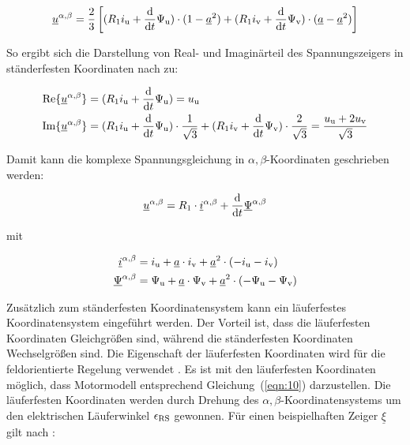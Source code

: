 \begin{align}
\underline{u}^{\alpha, \beta} = \frac{2}{3} \left[ (R_{\mathrm{1}}i_{\mathrm{u}} + \frac{\mathrm{d}}{\mathrm{d}t}\Psi_{\mathrm{u}})\cdot (1-\underline{a}^2) + (R_{\mathrm{1}}i_{\mathrm{v}} + \frac{\mathrm{d}}{\mathrm{d}t}\Psi_{\mathrm{v}})\cdot (\underline{a}-\underline{a}^2) \right]
\end{align}

So ergibt sich die Darstellung von Real- und Imaginärteil des Spannungszeigers in ständerfesten Koordinaten nach \textcite{kellner2012} zu:

\begin{align}
	\text{Re}\{ \underline{u}^{\alpha,\beta} \} &= (R_{\mathrm{1}}i_{\mathrm{u}}+\frac{\mathrm{d}}{\mathrm{d}t}\Psi_{\mathrm{u}}) = u_{\mathrm{u}} \\
	\text{Im}\{ \underline{u}^{\alpha,\beta} \} &= (R_{\mathrm{1}}i_{\mathrm{u}}+\frac{\mathrm{d}}{\mathrm{d}t}\Psi_{\mathrm{u}})\cdot \frac{1}{\sqrt{3}} + (R_{\mathrm{1}}i_{\mathrm{v}}+\frac{\mathrm{d}}{\mathrm{d}t}\Psi_{\mathrm{v}})\cdot \frac{2}{\sqrt{3}} = \frac{u_{\mathrm{u}}+2u_{\mathrm{v}}}{\sqrt{3}}
\end{align}

Damit kann die komplexe Spannungsgleichung in $\alpha,\beta$-Koordinaten geschrieben werden:

\begin{align}
	\underline{u}^{\alpha,\beta} = R_{\mathrm{1}}\cdot\underline{i}^{\alpha,\beta}+\frac{\mathrm{d}}{\mathrm{d}t}\underline{\Psi}^{\alpha,\beta}
\end{align}

mit

\begin{align}
	\underline{i}^{\alpha,\beta} &= i_{\mathrm{u}} + \underline{a}\cdot i_{\mathrm{v}} + \underline{a}^{2}\cdot (-i_{\mathrm{u}}-i_{\mathrm{v}}) \\
	\underline{\Psi}^{\alpha,\beta} &= \Psi_{\mathrm{u}} + \underline{a}\cdot \Psi_{\mathrm{v}} + \underline{a}^{2}\cdot (-\Psi_{\mathrm{u}}-\Psi_{\mathrm{v}})
\end{align}

Zusätzlich zum ständerfesten Koordinatensystem kann ein läuferfestes Koordinatensystem eingeführt werden.
Der Vorteil ist, dass die läuferfesten Koordinaten Gleichgrößen sind, während die ständerfesten Koordinaten Wechselgrößen sind.
Die Eigenschaft der läuferfesten Koordinaten wird für die feldorientierte Regelung verwendet \autocites{schroder2001}{nuss2010}{fuest2004}.
Es ist mit den läuferfesten Koordinaten möglich, dass Motormodell entsprechend Gleichung~(\ref{eqn:10}) darzustellen.
Die läuferfesten Koordinaten werden durch Drehung des $\alpha,\beta$-Koordinatensystems um den elektrischen Läuferwinkel $\epsilon_{\mathrm{RS}}$ gewonnen.
Für einen beispielhaften Zeiger $\underline{\xi}$ gilt nach \textcite{kellner2012}:

